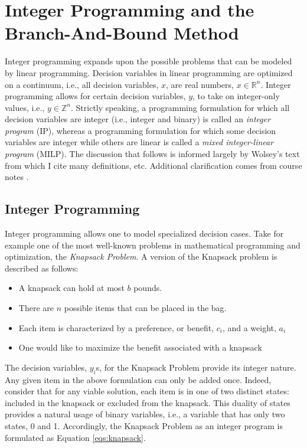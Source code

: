 \chapter{Integer Programming and the Branch-And-Bound Method}\label{app:ip}

Integer programming expands upon the possible problems that can be modeled by
linear programming. Decision variables in linear programming are optimized on a
continuum, i.e., all decision variables, $x$, are real numbers,
$x \in \mathbb{R}^n$. Integer programming allows for certain decision variables,
$y$, to take on integer-only values, i.e., $y \in \mathbb{Z}^n$. Strictly
speaking, a programming formulation for which all decision variables are integer
(i.e., integer and binary) is called an \textit{integer program} (IP), whereas a
programming formulation for which some decision variables are integer while
others are linear is called a \textit{mixed integer-linear program} (MILP). The
discussion that follows is informed largely by Wolsey's
text \cite{wolsey_integer_1998} from which I cite many definitions,
etc. Additional clarification comes from course notes \cite{luedtke_class_2010}.

\section{Integer Programming}

Integer programming allows one to model specialized decision cases. Take for
example one of the most well-known problems in mathematical programming and
optimization, the \textit{Knapsack Problem}. A version of the Knapsack problem
is described as follows:

\begin{itemize}
        \item A knapsack can hold at most $b$ pounds. 
        \item There are $n$ possible items that can be placed in the bag.
        \item Each item is characterized by a preference, or benefit, $c_i$, 
              and a weight, $a_i$
        \item One would like to maximize the benefit associated with a knapsack
\end{itemize}

The decision variables, $y_i$s, for the Knapsack Problem provide its integer
nature. Any given item in the above formulation can only be added once. Indeed,
consider that for any viable solution, each item is in one of two distinct
states: included in the knapsack or excluded from the knapsack. This duality of
states provides a natural usage of binary variables, i.e., a variable that has
only two states, 0 and 1. Accordingly, the Knapsack Problem as an integer
program is formulated as Equation \ref{eqs:knapsack}.

